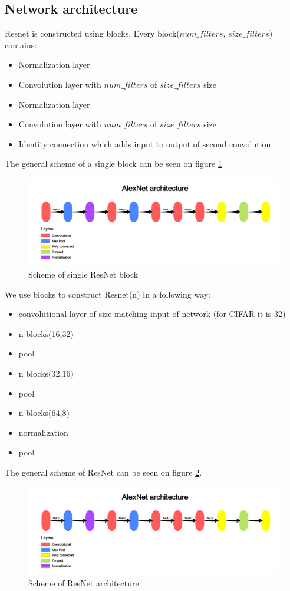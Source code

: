 \documentclass[licencjacka]{pracamgr}
\begin{document}
		\subsection{Network architecture}
		Resnet is constructed using blocks. Every block($num\_filters$, $size\_filters$) contains:
		\begin{itemize}
			\item Normalization layer
			\item Convolution layer with $num\_filters$ of $size\_filters$ size
			\item Normalization layer
			\item Convolution layer with $num\_filters$ of $size\_filters$ size
			\item Identity connection which adds input to output of second convolution
		\end{itemize}
		The general scheme of a single block can be seen on figure \ref{fig:144}
		\begin{figure}[h]
		\caption{Scheme of single ResNet block}
		\label{fig:144}
				\centering
				\includegraphics[width=\textwidth]{AlexNet}
		\end{figure}
		We use blocks to construct Resnet(n) in a following way:
		\begin{itemize}
			\item convolutional layer of size matching input of network (for CIFAR it is 32)
			\item n blocks(16,32)
			\item pool
			\item n blocks(32,16)
			\item pool
			\item n blocks(64,8)
			\item normalization 
			\item pool
		\end{itemize}
		The general scheme of ResNet can be seen on figure \ref{fig:666}.
		\begin{figure}[h]
		\caption{Scheme of ResNet architecture}
		\label{fig:666}
				\centering
				\includegraphics[width=\textwidth]{AlexNet}
		\end{figure}
\end{document}
